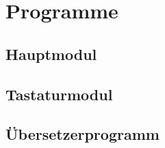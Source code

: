 \chapter{Programme}
\section{Hauptmodul}
\section{Tastaturmodul}
\section{Übersetzerprogramm}
\subsection{}